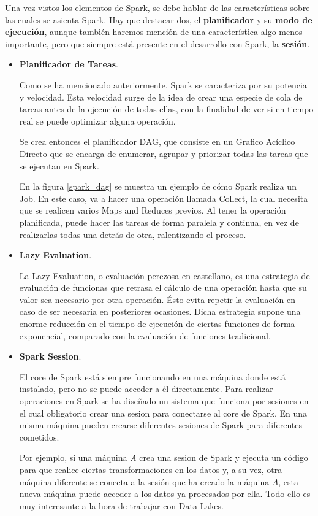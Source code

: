 Una vez vistos los elementos de Spark, se debe hablar de las características sobre las cuales se asienta Spark. Hay que destacar dos, el \textbf{planificador} y su \textbf{modo de ejecución}, aunque también haremos mención de una característica algo menos importante, pero que siempre está presente en el desarrollo con Spark, la \textbf{sesión}.

\begin{itemize}

\item \textbf{Planificador de Tareas}. 

Como se ha mencionado anteriormente, Spark se caracteriza por su potencia y velocidad. Esta velocidad surge de la idea de crear una especie de cola de tareas antes de la ejecución de todas ellas, con la finalidad de ver si en tiempo real se puede optimizar alguna operación. 

Se crea entonces el planificador DAG, que consiste en un Grafico Acíclico Directo que se encarga de enumerar, agrupar y priorizar todas las tareas que se ejecutan en Spark.


En la figura \ref{spark_dag} se muestra un ejemplo de cómo Spark realiza un Job. En este caso, va a hacer una operación llamada Collect, la cual necesita que se realicen varios Maps and Reduces previos. Al tener la operación planificada, puede hacer las tareas de forma paralela y continua, en vez de realizarlas todas una detrás de otra, ralentizando el proceso.


\item \textbf{Lazy Evaluation}. 

La Lazy Evaluation, o evaluación perezosa en castellano, es una estrategia de evaluación de funcionas que retrasa el cálculo de una operación hasta que su valor sea necesario por otra operación. Ésto evita repetir la evaluación en caso de ser necesaria en posteriores ocasiones. Dicha estrategia supone una enorme reducción en el tiempo de ejecución de ciertas funciones de forma exponencial, comparado con la evaluación de funciones tradicional. 

\clearpage

\item \textbf{Spark Session}. 

El core de Spark está siempre funcionando en una máquina donde está instalado, pero no se puede acceder a él directamente. Para realizar operaciones en Spark se ha diseñado un sistema que funciona por sesiones en el cual obligatorio crear una sesion para conectarse al core de Spark. En una misma máquina pueden crearse diferentes sesiones de Spark para diferentes cometidos. 

Por ejemplo, si una máquina \textit{A} crea una sesion de Spark y ejecuta un código para que realice ciertas transformaciones en los datos y, a su vez, otra máquina diferente se conecta a la sesión que ha creado la máquina \textit{A}, esta nueva máquina puede acceder a los datos ya procesados por ella. Todo ello es muy interesante a la hora de trabajar con Data Lakes. 


\end{itemize}
